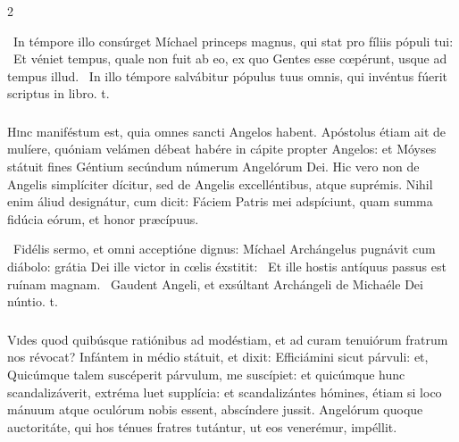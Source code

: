 \documentclass[9pt,twoside]{extarticle}
\begin{document}
\begin{multicols}{2}
\begin{tightlist}{}
\item {}~In témpore illo consúrget Míchael princeps magnus, qui stat pro fíliis pópuli tui: \textred{*}~Et véniet tempus, quale non fuit ab eo, ex quo Gentes esse cœpérunt, usque ad tempus illud. ~In illo témpore salvábitur pópulus tuus omnis, qui invéntus fúerit scriptus in libro. t. 
\end{tightlist}

\subsubsection*{\center {}}
\lettrine{H}inc maniféstum est, quia omnes sancti Angelos habent. Apóstolus étiam ait de mulíere, quóniam velámen débeat habére in cápite propter Angelos: et Móyses státuit fines Géntium secúndum númerum Angelórum Dei. Hic vero non de Angelis simplíciter dícitur, sed de Angelis excelléntibus, atque suprémis. Nihil enim áliud designátur, cum dicit: Fáciem Patris mei adspíciunt, quam summa fidúcia eórum, et honor præcípuus.

\begin{tightlist}{}
\item {}~Fidélis sermo, et omni acceptióne dignus: Míchael Archángelus pugnávit cum diábolo: grátia Dei ille victor in cœlis éxstitit: \textred{*}~Et ille hostis antíquus passus est ruínam magnam. ~Gaudent Angeli, et exsúltant Archángeli de Michaéle Dei núntio. t.
\end{tightlist}

\subsubsection*{\center {}}
\lettrine{V}ides quod quibúsque ratiónibus ad modéstiam, et ad curam tenuiórum fratrum nos révocat? Infántem in médio státuit, et dixit: Efficiámini sicut párvuli: et, Quicúmque talem suscéperit párvulum, me suscípiet: et quicúmque hunc scandalizáverit, extréma luet supplícia: et scandalizántes hómines, étiam si loco mánuum atque oculórum nobis essent, abscíndere jussit. Angelórum quoque auctoritáte, qui hos ténues fratres tutántur, ut eos venerémur, impéllit.


\end{multicols}
\end{document}

